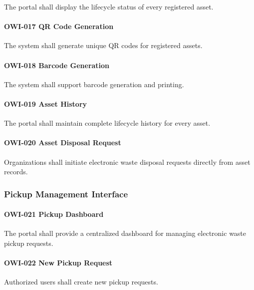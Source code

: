 The portal shall display the lifecycle status of every registered asset.

\paragraph{OWI-017 QR Code Generation}

The system shall generate unique QR codes for registered assets.

\paragraph{OWI-018 Barcode Generation}

The system shall support barcode generation and printing.

\paragraph{OWI-019 Asset History}

The portal shall maintain complete lifecycle history for every asset.

\paragraph{OWI-020 Asset Disposal Request}

Organizations shall initiate electronic waste disposal requests directly
from asset records.


\subsubsection*{Pickup Management Interface}

\paragraph{OWI-021 Pickup Dashboard}

The portal shall provide a centralized dashboard for managing electronic
waste pickup requests.

\paragraph{OWI-022 New Pickup Request}

Authorized users shall create new pickup requests.

